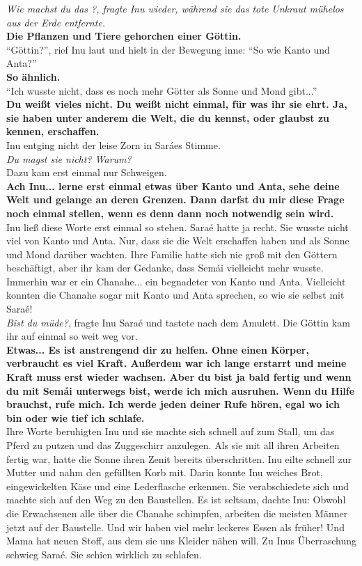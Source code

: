 \documentclass[a4paper,12pt]{book}
\begin{document}
\textit{Wie machst du das ?, fragte Inu wieder, während sie das tote Unkraut mühelos aus der Erde 
entfernte. }\\
\textbf{Die Pflanzen und Tiere gehorchen einer Göttin.}\\
``Göttin?'', rief Inu laut und hielt in der Bewegung inne: ``So wie Kanto und Anta?''\\
\textbf{So ähnlich.}\\
``Ich wusste nicht, dass es noch mehr Götter als Sonne und Mond gibt...''\\
\textbf{Du weißt vieles nicht. Du weißt nicht einmal, für was ihr sie ehrt. Ja, sie haben unter 
anderem die Welt, die du kennst, oder glaubst zu kennen, erschaffen.}\\
Inu entging nicht der leise Zorn in Saráes Stimme.\\
\textit{Du magst sie nicht? Warum?}\\
Dazu kam erst einmal nur Schweigen. \\
\textbf{Ach Inu... lerne erst einmal etwas über Kanto und Anta, sehe deine Welt und gelange an 
deren Grenzen. Dann darfst du mir diese Frage noch einmal stellen, wenn es denn dann noch notwendig 
sein wird.}\\
Inu ließ diese Worte erst einmal so stehen. Saraé hatte ja recht. Sie wusste nicht viel von Kanto 
und Anta. Nur, dass sie die Welt erschaffen haben und als Sonne und Mond darüber wachten. Ihre 
Familie hatte sich nie groß mit den Göttern beschäftigt, aber ihr kam der Gedanke, dass Semái 
vielleicht mehr wusste. Immerhin war er ein Chanahe... ein begnadeter von Kanto und Anta. 
Vielleicht konnten die Chanahe sogar mit Kanto und Anta sprechen, so wie sie selbst mit Saraé!\\
\textit{Bist du müde?}, fragte Inu Saraé und tastete nach dem Amulett. Die Göttin kam ihr auf 
einmal so weit weg vor. \\
\textbf{Etwas... Es ist anstrengend dir zu helfen. Ohne einen Körper, verbraucht es viel Kraft. 
Außerdem war ich lange erstarrt und meine Kraft muss erst wieder wachsen. Aber du bist ja bald 
fertig und wenn du mit Semái unterwegs bist, werde ich mich ausruhen. Wenn du Hilfe brauchst, rufe 
mich. Ich werde jeden deiner Rufe hören, egal wo ich bin oder wie tief ich schlafe.}\\
Ihre Worte beruhigten Inu und sie machte sich schnell auf zum Stall, um das Pferd zu putzen und das 
Zuggeschirr anzulegen. Als sie mit all ihren Arbeiten fertig war, hatte die Sonne ihren Zenit 
bereits überschritten. Inu eilte schnell zur Mutter und nahm den gefüllten Korb mit. Darin konnte 
Inu weiches Brot, eingewickelten Käse und eine Lederflasche erkennen. Sie verabschiedete sich und 
machte sich auf den Weg zu den Baustellen. Es ist seltsam, dachte Inu: Obwohl die Erwachsenen alle 
über die Chanahe schimpfen, arbeiten die meisten Männer jetzt auf der Baustelle. Und wir haben viel 
mehr leckeres Essen als früher! Und Mama hat neuen Stoff, aus dem sie uns Kleider nähen will.
Zu Inus Überraschung schwieg Saraé. Sie schien wirklich zu schlafen. \\
\end{document}
